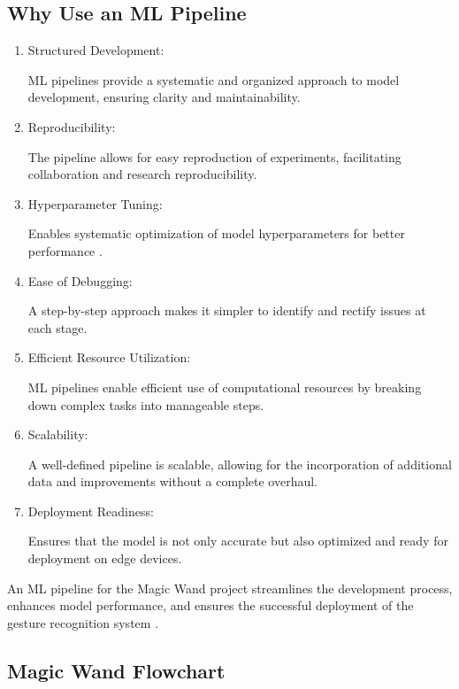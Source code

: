 \subsection{Why Use an ML Pipeline}

\begin{enumerate}
	
	\item Structured Development: 
	
	ML pipelines provide a systematic and organized approach to model development, ensuring clarity and maintainability.
	
	\item Reproducibility: 
	
	The pipeline allows for easy reproduction of experiments, facilitating collaboration and research reproducibility.
	
	\item Hyperparameter Tuning: 
	
	Enables systematic optimization of model hyperparameters for better performance \cite{Cong:2022}.
	
	\item Ease of Debugging:
	
	A step-by-step approach makes it simpler to identify and rectify issues at each stage.
	
	\item Efficient Resource Utilization: 
	
	ML pipelines enable efficient use of computational resources by breaking down complex tasks into manageable steps.
	
	\item Scalability: 
	
	A well-defined pipeline is scalable, allowing for the incorporation of additional data and improvements without a complete overhaul.
	
	\item Deployment Readiness: 
	
	Ensures that the model is not only accurate but also optimized and ready for deployment on edge devices.
	
\end{enumerate}

An ML pipeline for the Magic Wand project streamlines the development process, enhances model performance, and ensures the successful deployment of the gesture recognition system \cite{Zhou:2020}.

\subsection{Magic Wand Flowchart}

